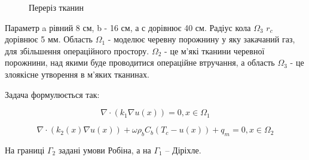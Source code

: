 \begin{figure}[ht!]
    \centering
    
    \caption{Переріз тканин}
    \label{fig:thermo_2d_domain}
\end{figure}

\noindent Параметр a рівний 8 см, b - 16 см, а с дорівнює 40 см. Радіус кола $\Omega_3$ $r_c$ дорівнює 5 мм. Область 
$\Omega_1$ - моделює черевну порожнину у яку закачаний газ, для збільшення операційного простору. $\Omega_2$ - це 
м'які тканини черевної порожнини, над якими буде проводитися операційне втручання, а область $\Omega_3$ - це злоякісне
утворення в м'яких тканинах.

\noindent Задача формулюється так:

\begin{equation}
    \label{eqn:thermo_2d_eqn_co2}
    \nabla \cdot (k_1 \nabla u(x)) = 0, x \in \Omega_1
\end{equation}

\begin{equation}
    \label{eqn:thermo_2d_eqn_tissue}
    \nabla \cdot (k_2(x) \nabla u(x)) + \omega \rho_b C_b (T_c - u(x)) + q_m  = 0, x \in \Omega_2
\end{equation}

\noindent На границі $\Gamma_2$ задані умови Робіна, а на $\Gamma_1$ -- Діріхле.

